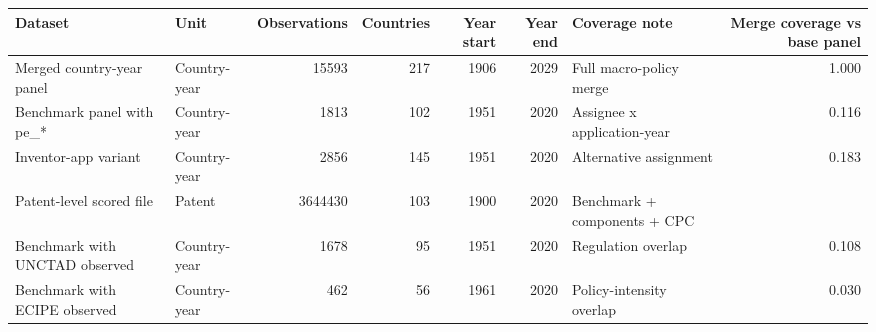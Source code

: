 \begin{tabular}{llrrrrlr}
\toprule
Dataset & Unit & Observations & Countries & Year start & Year end & Coverage note & Merge coverage vs base panel \\
\midrule
Merged country-year panel & Country-year & 15593 & 217 & 1906 & 2029 & Full macro-policy merge & 1.000 \\
Benchmark panel with pe_* & Country-year & 1813 & 102 & 1951 & 2020 & Assignee x application-year & 0.116 \\
Inventor-app variant & Country-year & 2856 & 145 & 1951 & 2020 & Alternative assignment & 0.183 \\
Patent-level scored file & Patent & 3644430 & 103 & 1900 & 2020 & Benchmark + components + CPC &  \\
Benchmark with UNCTAD observed & Country-year & 1678 & 95 & 1951 & 2020 & Regulation overlap & 0.108 \\
Benchmark with ECIPE observed & Country-year & 462 & 56 & 1961 & 2020 & Policy-intensity overlap & 0.030 \\
\bottomrule
\end{tabular}
